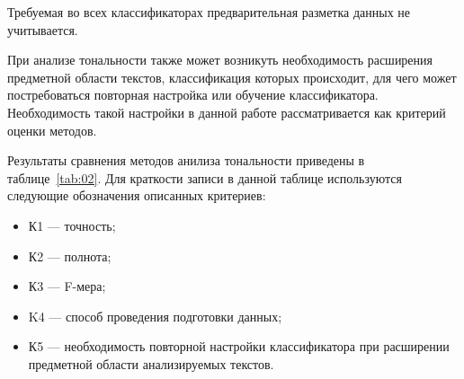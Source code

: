 Требуемая во всех классификаторах предварительная разметка данных не
учитывается.

При анализе тональности также может возникуть необходимость расширения
предметной области текстов, классификация которых происходит, для чего
может постребоваться повторная настройка или обучение классификатора.
Необходимость такой настройки в данной работе рассматривается как критерий
оценки методов.

Результаты сравнения методов анилиза тональности приведены в
таблице~\ref{tab:02}. Для краткости записи в данной таблице используются
следующие обозначения описанных критериев:
\begin{itemize}
    \item К1 --- точность;
    \item К2 --- полнота;
    \item К3 --- F-мера;
    \item K4 --- способ проведения подготовки данных;
    \item К5 --- необходимость повторной настройки классификатора при расширении
        предметной области анализируемых текстов.
\end{itemize}

